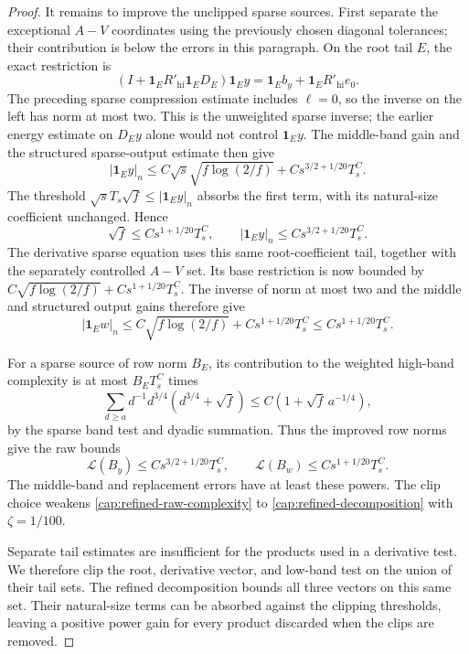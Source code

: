 \begin{proof}
It remains to improve the unclipped sparse sources. First separate the
exceptional \(A-V\) coordinates using the previously chosen diagonal
tolerances; their contribution is below the errors in this paragraph.
On the root tail \(E\), the exact restriction is
\[
 (I+\mathbf1_E R'_{\mathrm{hi}}\mathbf1_E D_E)\mathbf1_Ey
 =\mathbf1_Eb_y+\mathbf1_E R'_{\mathrm{hi}}e_0.
\]
The preceding sparse compression estimate includes \(\ell=0\), so the
inverse on the left has norm at most two. This is the unweighted sparse
inverse; the earlier energy estimate on \(D_Ey\) alone would not control
\(\mathbf1_Ey\). The middle-band gain and the structured sparse-output
estimate then give
\[
 |\mathbf1_Ey|_n
 \le C\sqrt s\sqrt{f\log(2/f)}+Cs^{3/2+1/20}T_s^C.
\]
The threshold \(\sqrt sT_s\sqrt f\le|\mathbf1_Ey|_n\) absorbs the first
term, with its natural-size coefficient unchanged. Hence
\[
 \sqrt f\le Cs^{1+1/20}T_s^C,\qquad
 |\mathbf1_Ey|_n\le Cs^{3/2+1/20}T_s^C.
\]
The derivative sparse equation uses this same root-coefficient tail,
together with the separately controlled \(A-V\) set. Its base restriction
is now bounded by
\(C\sqrt{f\log(2/f)}+Cs^{1+1/20}T_s^C\). The inverse of norm at most two
and the middle and structured output gains therefore give
\[
 |\mathbf1_Ew|_n
 \le C\sqrt{f\log(2/f)}+Cs^{1+1/20}T_s^C
 \le Cs^{1+1/20}T_s^C.
\]

For a sparse source of row norm \(B_E\), its contribution to the weighted
high-band complexity is at most \(B_E T_s^C\) times
\[
 \sum_{d\ge a}d^{-1}d^{3/4}(d^{3/4}+\sqrt f)
 \le C(1+\sqrt f\,a^{-1/4}),
\]
by the sparse band test and dyadic summation. Thus the improved row norms
give the raw bounds
\begin{equation}\label{cap:refined-raw-complexity}
 \mathscr L(B_y)\le Cs^{3/2+1/20}T_s^C,\qquad
 \mathscr L(B_w)\le Cs^{1+1/20}T_s^C.
\end{equation}
The middle-band and replacement errors have at least these powers.
The clip choice weakens \eqref{cap:refined-raw-complexity} to
\eqref{cap:refined-decomposition} with \(\zeta=1/100\).

Separate tail estimates are insufficient for the products used in a derivative
test. We therefore clip the root, derivative vector, and low-band test on the
union of their tail sets. The refined decomposition bounds all three vectors
on this same set. Their natural-size terms can be absorbed against the
clipping thresholds, leaving a positive power gain for every product discarded
when the clips are removed.


\end{proof}
